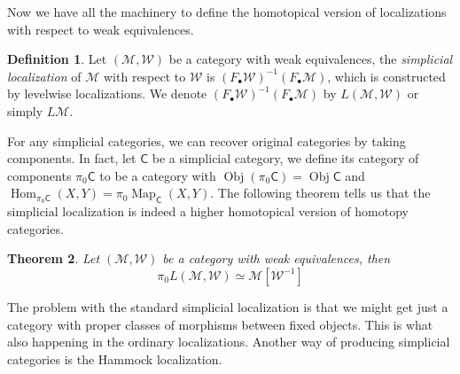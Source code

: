 \documentclass[12pt]{amsart}
\newtheorem{thm}{Theorem}[section]
\theoremstyle{definition}
\newtheorem{defn}[thm]{Definition}
\theoremstyle{remark}
\numberwithin{equation}{section}
\newcommand{\CM}{{\mathcal M}}
\newcommand{\CC}{{\mathsf C}}
\newcommand{\cm}{{\mathcal{M}}}
\newcommand{\CW}{{\mathcal{W}}}
\newcommand{\1}{{\mathbb{1}}}
\newcommand{\ob}{\operatorname{Obj}}
\newcommand{\Hom}{\operatorname{Hom}}
\newcommand{\map}{\operatorname{Map}}
\begin{document}
Now we have all the machinery to define the homotopical version of localizations with respect to weak equivalences.

\begin{defn}
	Let $(\cm, \CW)$ be a category with weak equivalences, the {\it simplicial localization} of $\cm$ with respect to $\CW$ is $(F_{\bullet}\CW)^{-1}(F_{\bullet}\CM)$, which is constructed by levelwise localizations. We denote $(F_{\bullet}\CW)^{-1}(F_{\bullet}\CM)$ by $L(\cm, \CW)$ or simply $L\cm$.
\end{defn}

For any simplicial categories, we can recover original categories by taking components. In fact, let $\CC$ be a simplicial category, we define its category of components $\pi_0\CC$ to be a category with $\ob(\pi_0 \CC)=\ob \CC$ and $\Hom_{\pi_0 \CC}(X,Y)=\pi_0 \map_{\CC}(X,Y)$. The following theorem tells us that the simplicial localization is indeed a higher homotopical version of homotopy categories.
\begin{thm}
	Let $(\cm, \CW)$ be a category with weak equivalences, then
	\begin{equation*}
	\pi_0 L(\cm, \CW) \simeq  \cm[\CW^{-1}]
	\end{equation*}
\end{thm}

The problem with the standard simplicial localization is that we might get just a category with proper classes of morphisms between fixed objects. This is what also happening in the ordinary localizations. Another way of producing simplicial categories is the Hammock localization.
\end{document}
